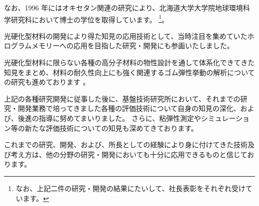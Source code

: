 \documentclass[a4j]{jsarticle}
\begin{document}
{\begin{description}
{なお、1996 年にはオキセタン関連の研究により、北海道大学大学院地球環境科学研究科において博士の学位を取得しています。
}
\footnote
{
なお、上記二件の研究・開発の結果にたいして、社長表彰をそれぞれ受けています。
}。

\item[ホログラムメモリー]
光硬化型材料の開発により得た知見の応用技術として、当時注目を集めていたホログラムメモリーへの応用を目指した研究・開発にも参画いたしました。

\item[ネットワークポリマーのゴム弾性]
光硬化型材料に限らない各種の高分子材料の物性設計を通して体系化できてきた知見をまとめ、材料の耐久性向上にも強く関連するゴム弾性挙動の解析についての研究も進めております
。


\end{description}

上記の各種研究開発に従事した後に、基盤技術研究所において、それまでの研究・開発業務で培ってきました各種の評価技術について自身の知見の深化、および、後進の指導に努めてまいりました。
さらに、粘弾性測定やシミュレーション等の新たな評価技術についての知見も深めてきております。

これまでの研究、開発、および、所長としての経験により身に付けてきた技術及び考え方は、他の分野の研究・開発においても十分に応用できるものと信じております。

}

%
%
\end{document}
